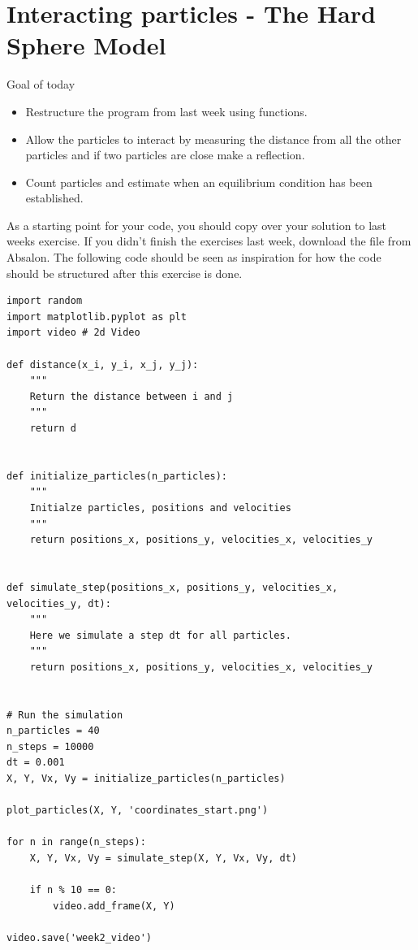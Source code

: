 \documentclass{article}
\begin{document}
\newpage
\section{Interacting particles - The Hard Sphere Model}

Goal of today

\begin{itemize}
  \item Restructure the program from last week using functions.
  \item Allow the particles to interact by measuring the distance from all the other particles
    and if two particles are close make a reflection.
  \item Count particles and estimate when an equilibrium condition has been established.
\end{itemize}

As a starting point for your code, you should copy over your solution to last
weeks exercise. If you didn't finish the exercises last week, download the file
 from Absalon. The following code should be seen as
inspiration for how the code should be structured after this exercise is done.

\begin{lstlisting}
import random
import matplotlib.pyplot as plt
import video # 2d Video

def distance(x_i, y_i, x_j, y_j):
    """
    Return the distance between i and j
    """
    return d


def initialize_particles(n_particles):
    """
    Initialze particles, positions and velocities
    """
    return positions_x, positions_y, velocities_x, velocities_y


def simulate_step(positions_x, positions_y, velocities_x, velocities_y, dt):
    """
    Here we simulate a step dt for all particles.
    """
    return positions_x, positions_y, velocities_x, velocities_y


# Run the simulation
n_particles = 40
n_steps = 10000
dt = 0.001
X, Y, Vx, Vy = initialize_particles(n_particles)

plot_particles(X, Y, 'coordinates_start.png')

for n in range(n_steps):
    X, Y, Vx, Vy = simulate_step(X, Y, Vx, Vy, dt)

    if n % 10 == 0:
        video.add_frame(X, Y)

video.save('week2_video')

\end{lstlisting}
\end{document}
